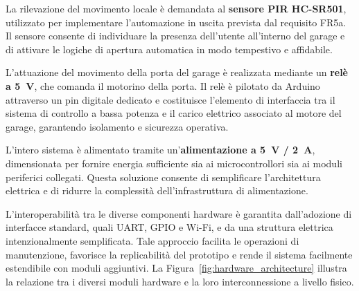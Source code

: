 La rilevazione del movimento locale è demandata al \textbf{sensore PIR
HC-SR501}, utilizzato per implementare l’automazione in uscita prevista dal
requisito FR5a. Il sensore consente di individuare la presenza dell’utente
all’interno del garage e di attivare le logiche di apertura automatica in modo
tempestivo e affidabile.

L’attuazione del movimento della porta del garage è realizzata mediante un
\textbf{relè a 5~V}, che comanda il motorino della porta. Il relè è pilotato da
Arduino attraverso un pin digitale dedicato e costituisce l’elemento di
interfaccia tra il sistema di controllo a bassa potenza e il carico elettrico
associato al motore del garage, garantendo isolamento e sicurezza operativa.

L’intero sistema è alimentato tramite un’\textbf{alimentazione a 5~V / 2~A},
dimensionata per fornire energia sufficiente sia ai microcontrollori sia ai
moduli periferici collegati. Questa soluzione consente di semplificare
l’architettura elettrica e di ridurre la complessità dell’infrastruttura di
alimentazione.

L’interoperabilità tra le diverse componenti hardware è garantita
dall’adozione di interfacce standard, quali UART, GPIO e Wi-Fi, e da una
struttura elettrica intenzionalmente semplificata. Tale approccio facilita le
operazioni di manutenzione, favorisce la replicabilità del prototipo e rende il
sistema facilmente estendibile con moduli aggiuntivi. La
Figura~\ref{fig:hardware_architecture} illustra la relazione tra i diversi
moduli hardware e la loro interconnessione a livello fisico.



